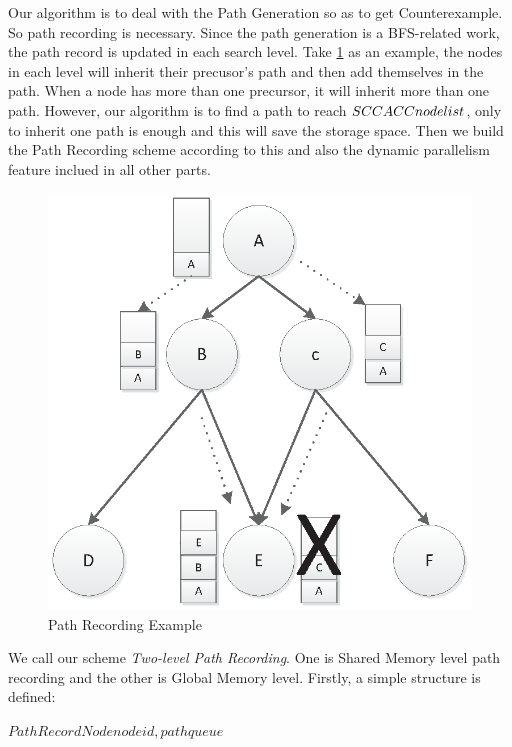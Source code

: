 \documentclass{llncs}
\begin{document}
Our algorithm is to deal with the Path Generation so as to get Counterexample. So path recording is necessary. Since the path generation is a BFS-related work, the path record is updated in each search level. Take \ref{fig:PathRExp} as an example, the nodes in each level will inherit their precusor's path and then add themselves in the path. When a node has more than one precursor, it will inherit more than one path. However, our algorithm is to find a path to reach $SCC\/ACCnodelist$, only to inherit one path is enough and this will save the storage space. Then we build the Path Recording scheme according to this and also the dynamic parallelism feature inclued in all other parts.

\begin{figure}[htbp]
    \includegraphics[width=\textwidth]{PathRExp.eps}
	\caption{Path Recording Example}
	\label{fig:PathRExp}
\end{figure}

We call our scheme \textsl{Two-level Path Recording}. One is Shared Memory level path recording and the other is Global Memory level. Firstly, a simple structure is defined:

\begin{center} $PathRecordNode{nodeid, pathqueue}$\end{center}
\end{document}
